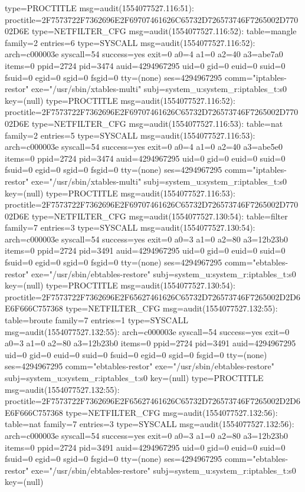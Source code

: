 \documentclass[]{report}
\newenvironment{Shaded}{}{}
\newcommand{\NormalTok}[1]{#1}
\begin{document}
\begin{Shaded}
\begin{Highlighting}[]
\NormalTok{type=PROCTITLE msg=audit(1554077527.116:51): proctitle=2F7573722F7362696E2F69707461626C65732D726573746F7265002D77002D6E}
\NormalTok{type=NETFILTER_CFG msg=audit(1554077527.116:52): table=mangle family=2 entries=6}
\NormalTok{type=SYSCALL msg=audit(1554077527.116:52): arch=c000003e syscall=54 success=yes exit=0 a0=4 a1=0 a2=40 a3=abe7a0 items=0 ppid=2724 pid=3474 auid=4294967295 uid=0 gid=0 euid=0 suid=0 fsuid=0 egid=0 sgid=0 fsgid=0 tty=(none) ses=4294967295 comm="iptables-restor" exe="/usr/sbin/xtables-multi" subj=system_u:system_r:iptables_t:s0 key=(null)}
\NormalTok{type=PROCTITLE msg=audit(1554077527.116:52): proctitle=2F7573722F7362696E2F69707461626C65732D726573746F7265002D77002D6E}
\NormalTok{type=NETFILTER_CFG msg=audit(1554077527.116:53): table=nat family=2 entries=5}
\NormalTok{type=SYSCALL msg=audit(1554077527.116:53): arch=c000003e syscall=54 success=yes exit=0 a0=4 a1=0 a2=40 a3=abe5e0 items=0 ppid=2724 pid=3474 auid=4294967295 uid=0 gid=0 euid=0 suid=0 fsuid=0 egid=0 sgid=0 fsgid=0 tty=(none) ses=4294967295 comm="iptables-restor" exe="/usr/sbin/xtables-multi" subj=system_u:system_r:iptables_t:s0 key=(null)}
\NormalTok{type=PROCTITLE msg=audit(1554077527.116:53): proctitle=2F7573722F7362696E2F69707461626C65732D726573746F7265002D77002D6E}
\NormalTok{type=NETFILTER_CFG msg=audit(1554077527.130:54): table=filter family=7 entries=3}
\NormalTok{type=SYSCALL msg=audit(1554077527.130:54): arch=c000003e syscall=54 success=yes exit=0 a0=3 a1=0 a2=80 a3=12b23b0 items=0 ppid=2724 pid=3491 auid=4294967295 uid=0 gid=0 euid=0 suid=0 fsuid=0 egid=0 sgid=0 fsgid=0 tty=(none) ses=4294967295 comm="ebtables-restor" exe="/usr/sbin/ebtables-restore" subj=system_u:system_r:iptables_t:s0 key=(null)}
\NormalTok{type=PROCTITLE msg=audit(1554077527.130:54): proctitle=2F7573722F7362696E2F65627461626C65732D726573746F7265002D2D6E6F666C757368}
\NormalTok{type=NETFILTER_CFG msg=audit(1554077527.132:55): table=broute family=7 entries=1}
\NormalTok{type=SYSCALL msg=audit(1554077527.132:55): arch=c000003e syscall=54 success=yes exit=0 a0=3 a1=0 a2=80 a3=12b23b0 items=0 ppid=2724 pid=3491 auid=4294967295 uid=0 gid=0 euid=0 suid=0 fsuid=0 egid=0 sgid=0 fsgid=0 tty=(none) ses=4294967295 comm="ebtables-restor" exe="/usr/sbin/ebtables-restore" subj=system_u:system_r:iptables_t:s0 key=(null)}
\NormalTok{type=PROCTITLE msg=audit(1554077527.132:55): proctitle=2F7573722F7362696E2F65627461626C65732D726573746F7265002D2D6E6F666C757368}
\NormalTok{type=NETFILTER_CFG msg=audit(1554077527.132:56): table=nat family=7 entries=3}
\NormalTok{type=SYSCALL msg=audit(1554077527.132:56): arch=c000003e syscall=54 success=yes exit=0 a0=3 a1=0 a2=80 a3=12b23b0 items=0 ppid=2724 pid=3491 auid=4294967295 uid=0 gid=0 euid=0 suid=0 fsuid=0 egid=0 sgid=0 fsgid=0 tty=(none) ses=4294967295 comm="ebtables-restor" exe="/usr/sbin/ebtables-restore" subj=system_u:system_r:iptables_t:s0 key=(null)}

\end{Highlighting}
\end{Shaded}
\end{document}
